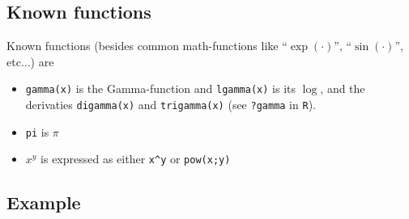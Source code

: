 \documentclass[a4paper,11pt]{article}
\begin{document}
\subsection*{Known functions}
Known functions (besides common math-functions like ``$\exp(\cdot)$'',
``$\sin(\cdot)$'', etc...) are
\begin{itemize}
\item \verb|gamma(x)| is the Gamma-function and \verb|lgamma(x)| is
    its $\log$, and the derivaties \verb|digamma(x)| and
    \verb|trigamma(x)| (see \verb|?gamma| in \verb|R|).
\item \verb|pi| is $\pi$
\item $x^y$ is expressed as either \verb|x^y| or \verb|pow(x;y)|
\end{itemize}

\subsection*{Example}

\end{document}
